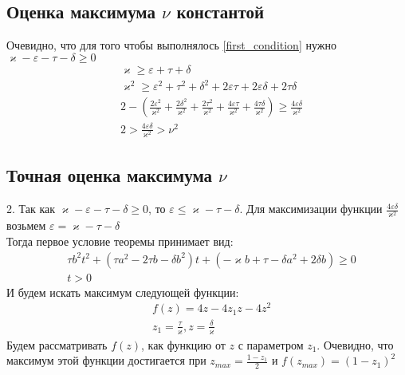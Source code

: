 \documentclass[a4paper]{article}
\begin{document}
\subsection{Оценка максимума $\nu$ константой}
Очевидно, что для того чтобы выполнялось \ref{first_condition} нужно  $\varkappa - \varepsilon - \tau - \delta \geq 0$
\begin{equation}\label{first_condition}
 \begin{aligned}
&\varkappa \geq \varepsilon+\tau+\delta \\
&\varkappa^2 \geq \varepsilon^2 + \tau^2 + \delta^2 + 2\varepsilon\tau + 2\varepsilon\delta + 2\tau\delta\\
&2 -(\frac{2\varepsilon^2}{\varkappa^2} + \frac{2\delta^2}{\varkappa^2} + \frac{2\tau^2}{\varkappa^2} +\frac{4\varepsilon\tau}{\varkappa^2} + \frac{4\tau\delta}{\varkappa^2}) \geq \frac{4\varepsilon\delta}{\varkappa^2}\\
&2 > \frac{4\varepsilon\delta}{\varkappa^2} > \nu^2
 \end{aligned}
\end{equation}

\subsection{Точная оценка максимума $\nu$}
2. Так как $\varkappa - \varepsilon - \tau - \delta \geq 0$, то $ \varepsilon \leq \varkappa - \tau - \delta$. Для максимизации функции $\frac{4\varepsilon\delta}{\varkappa^2}$ возьмем $\varepsilon = \varkappa - \tau - \delta$\\
Тогда первое условие теоремы принимает вид:
\begin{equation}\label{ineq1} 
 \begin{aligned}
&\tau b^2t^2 + (\tau a^2-2 \tau b - \delta b^2)t + (-\varkappa b+\tau-\delta a^2 + 2\delta b) \geq 0\\
&t > 0
 \end{aligned}
\end{equation}
И будем искать максимум следующей функции: 
\begin{equation}
 \begin{aligned}
&f(z) = 4z-4z_1z - 4z^2\\
&z_1 = \frac{\tau}{\varkappa}, z = \frac{\delta}{\varkappa}
 \end{aligned}
\end{equation} 
Будем рассматривать $f(z)$, как функцию от $z$ с параметром $z_1$. Очевидно, что максимум этой функции достигается при $z_{max} = \frac{1-z_1}{2}$ и $f(z_{max}) = (1-z_1)^2$\\
\end{document}

